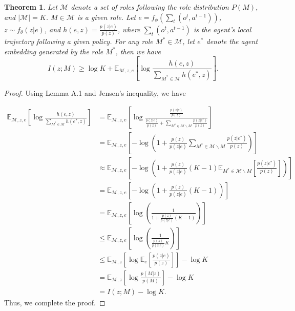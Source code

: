 \documentclass{article} %
\newtheorem{theorem}{Theorem}
\begin{document}
\setcounter{theorem}{0}
\begin{theorem}
    Let $\mathcal{M}$ denote a set of roles following the role distribution $P(M)$, and $|\mathcal{M}|\!=\!K$.
    $M\!\in\! \mathcal{M}$ is a given role.
    Let $e\!=\!f_{\phi}(\sum_t (o^t,a^{t-1}))$, $z\!\sim\! f_{\theta}(z|e)$, and $h(e,z)\!=\!\frac{p(z|e)}{p(z)}$, where $\sum_t(o^t,a^{t-1})$ is the agent's local trajectory following a given policy.
    For any role $M^*\!\in\!\mathcal{M}$, let $e^*$ denote the agent embedding generated by the role $M^*$, then we have
    \begin{equation}
        I(z; M) \ge \log K +  \mathbb{E}_{\mathcal{M},z,e}\left[\log\frac{h(e,z)}{\sum_{M^*\in\mathcal{M}}h(e^*,z)}\right]. \tag{2}
    \end{equation}
\end{theorem}

\begin{proof}
Using Lemma A.1 and Jensen's inequality, we have

\begin{equation}
\begin{aligned}
\mathbb{E}_{\mathcal{M},z,e}\left[\log\frac{h(e,z)}{\sum_{M^*\in\mathcal{M}}h(e^*,z)}\right] 
&= \mathbb{E}_{\mathcal{M},z,e}\left[\log\frac{\frac{p(z|e)}{p(z)}}{\frac{p(z|e)}{p(z)} + \sum_{M^*\in\mathcal{M}\backslash M}\frac{p(z|e^*)}{p(z)}}\right]  \\
&= \mathbb{E}_{\mathcal{M},z,e}\left[ -\log\left( 1+\frac{p(z)}{p(z|e)}\sum_{M^*\in\mathcal{M}\backslash M}\frac{p(z|e^*)}{p(z)} \right) \right] \\
&\approx \mathbb{E}_{\mathcal{M},z,e}\left[ -\log\left( 1+\frac{p(z)}{p(z|e)}(K-1)\mathbb{E}_{M^*\in\mathcal{M}\backslash M}\left[\frac{p(z|e^*)}{p(z)}\right] \right) \right] \\
&= \mathbb{E}_{\mathcal{M},z,e}\left[ -\log\left( 1+\frac{p(z)}{p(z|e)}(K-1) \right) \right] \\
&= \mathbb{E}_{\mathcal{M},z,e}\left[ \log\left( \frac{1}{1+\frac{p(z)}{p(z|e)}(K-1)} \right) \right] \\
&\le \mathbb{E}_{\mathcal{M},z,e}\left[ \log\left( \frac{1}{\frac{p(z)}{p(z|e)}K} \right) \right] \\
&\le \mathbb{E}_{\mathcal{M},z}\left[ \log \mathbb{E}_{e}\left[ \frac{p(z|e)}{p(z)} \right] \right] - \log K \\
&= \mathbb{E}_{\mathcal{M},z}\left[ \log \frac{p(M|z)}{p(M)} \right] - \log K \\
&= I(z; M) - \log K.
\end{aligned}
\end{equation}
Thus, we complete the proof.
\end{proof}
\end{document}
